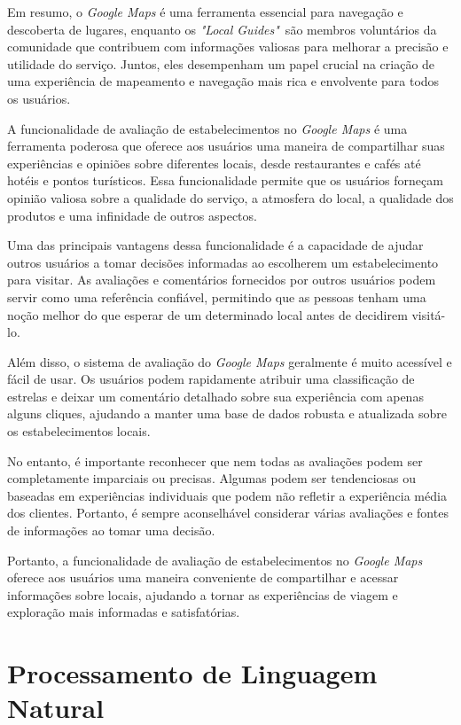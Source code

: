Em resumo, o \textit{Google Maps} é uma ferramenta essencial para navegação e descoberta de lugares, enquanto os \textit{"Local Guides"}~são membros voluntários da comunidade que contribuem com informações valiosas para melhorar a precisão e utilidade do serviço. Juntos, eles desempenham um papel crucial na criação de uma experiência de mapeamento e navegação mais rica e envolvente para todos os usuários.

A funcionalidade de avaliação de estabelecimentos no \textit{Google Maps} é uma ferramenta poderosa que oferece aos usuários uma maneira de compartilhar suas experiências e opiniões sobre diferentes locais, desde restaurantes e cafés até hotéis e pontos turísticos. Essa funcionalidade permite que os usuários forneçam opinião valiosa sobre a qualidade do serviço, a atmosfera do local, a qualidade dos produtos e uma infinidade de outros aspectos.

Uma das principais vantagens dessa funcionalidade é a capacidade de ajudar outros usuários a tomar decisões informadas ao escolherem um estabelecimento para visitar. As avaliações e comentários fornecidos por outros usuários podem servir como uma referência confiável, permitindo que as pessoas tenham uma noção melhor do que esperar de um determinado local antes de decidirem visitá-lo.

Além disso, o sistema de avaliação do \textit{Google Maps} geralmente é muito acessível e fácil de usar. Os usuários podem rapidamente atribuir uma classificação de estrelas e deixar um comentário detalhado sobre sua experiência com apenas alguns cliques, ajudando a manter uma base de dados robusta e atualizada sobre os estabelecimentos locais.

No entanto, é importante reconhecer que nem todas as avaliações podem ser completamente imparciais ou precisas. Algumas podem ser tendenciosas ou baseadas em experiências individuais que podem não refletir a experiência média dos clientes. Portanto, é sempre aconselhável considerar várias avaliações e fontes de informações ao tomar uma decisão.

Portanto, a funcionalidade de avaliação de estabelecimentos no \textit{Google Maps} oferece aos usuários uma maneira conveniente de compartilhar e acessar informações sobre locais, ajudando a tornar as experiências de viagem e exploração mais informadas e satisfatórias.

\section{Processamento de Linguagem Natural}

